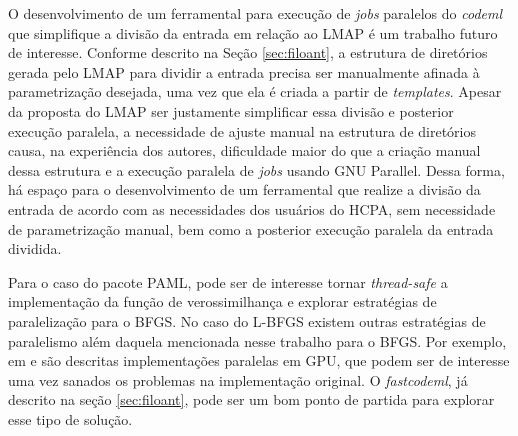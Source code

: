 \documentclass[cic,tc]{iiufrgs}
\begin{document}
O desenvolvimento de um ferramental para execução de \textit{jobs} paralelos do
\textit{codeml} que simplifique a divisão da entrada em relação ao LMAP é um trabalho
futuro de interesse. Conforme descrito na Seção \ref{sec:filoant}, a estrutura
de diretórios gerada pelo LMAP para dividir a entrada precisa ser manualmente
afinada à parametrização desejada, uma vez que ela é criada a partir de
\textit{templates}. Apesar da proposta do LMAP ser justamente simplificar essa
divisão e posterior execução paralela, a necessidade de ajuste manual na
estrutura de diretórios causa, na experiência dos autores, dificuldade maior do
que a criação manual dessa estrutura e a execução paralela de \textit{jobs} usando GNU
Parallel. Dessa forma, há espaço para o desenvolvimento de um ferramental que
realize a divisão da entrada de acordo com as necessidades dos usuários do
HCPA, sem necessidade de parametrização manual, bem como a posterior execução
paralela da entrada dividida.

Para o caso do pacote PAML, pode ser de interesse tornar \textit{thread-safe} a
implementação da função de verossimilhança e explorar estratégias de
paralelização para o BFGS. No caso do L-BFGS existem outras estratégias de
paralelismo além daquela mencionada nesse trabalho para o BFGS. Por exemplo, em
\cite{fei2014parallel} e \cite{sanseverino2014cuda} são descritas
implementações paralelas em GPU, que podem ser de interesse uma vez sanados os
problemas na implementação original. O \textit{fastcodeml}, já descrito na seção
\ref{sec:filoant}, pode ser um bom ponto de partida para explorar esse tipo de
solução.

%
%
%
%



\end{document}

